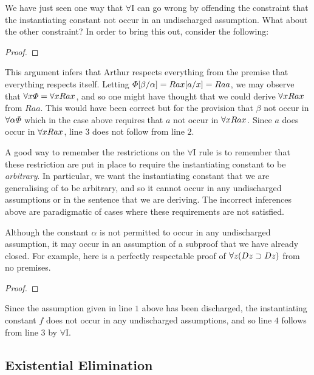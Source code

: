 We have just seen one way that $\forall$I can go wrong by offending the constraint that the instantiating constant not occur in an undischarged assumption.
What about the other constraint?
In order to bring this out, consider the following:

\begin{proof}
	 \pr{}
	 
   
\end{proof}

This argument infers that Arthur respects everything from the premise that everything respects itself.
Letting $\varPhi[\beta/\alpha]=Rax[a/x]=Raa$, we may observe that $\forall x\varPhi=\forall xRax$, and so one might have thought that we could derive $\forall xRax$ from $Raa$.
This would have been correct but for the provision that $\beta$ not occur in $\forall \alpha\varPhi$ which in the case above requires that $a$ not occur in $\forall xRax$.
Since $a$ does occur in $\forall xRax$, line $3$ does not follow from line $2$.

A good way to remember the restrictions on the $\forall$I rule is to remember that these restriction are put in place to require the instantiating constant to be \textit{arbitrary}.
In particular, we want the instantiating constant that we are generalising of to be arbitrary, and so it cannot occur in any undischarged assumptions or in the sentence that we are deriving.
The incorrect inferences above are paradigmatic of cases where these requirements are not satisfied.

Although the constant $\alpha$ is not permitted to occur in any undischarged assumption, it may occur in an assumption of a subproof that we have already closed.
For example, here is a perfectly respectable proof of $\forall z(Dz \supset Dz)$ from no premises.

\begin{proof}
	\open
		 \as{}
		 
	\close
\end{proof}

Since the assumption given in line $1$ above has been discharged, the instantiating constant $f$ does not occur in any undischarged assumptions, and so line $4$ follows from line $3$ by $\forall$I. 



\subsection{Existential Elimination}
  \label{sec:ExistElim}

